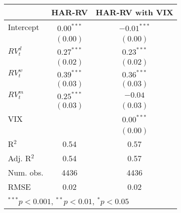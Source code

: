 
\begin{tabular}{l c c }
\hline
 & HAR-RV & HAR-RV with VIX \\
\hline
Intercept    & $0.00^{***}$ & $-0.01^{***}$ \\
             & $(0.00)$     & $(0.00)$      \\
$RV_{t}^{d}$ & $0.27^{***}$ & $0.23^{***}$  \\
             & $(0.02)$     & $(0.02)$      \\
$RV_{t}^{w}$ & $0.39^{***}$ & $0.36^{***}$  \\
             & $(0.03)$     & $(0.03)$      \\
$RV_{t}^{m}$ & $0.25^{***}$ & $-0.04$       \\
             & $(0.03)$     & $(0.03)$      \\
VIX          &              & $0.00^{***}$  \\
             &              & $(0.00)$      \\
\hline
R$^2$        & 0.54         & 0.57          \\
Adj. R$^2$   & 0.54         & 0.57          \\
Num. obs.    & 4436         & 4436          \\
RMSE         & 0.02         & 0.02          \\
\hline
\multicolumn{3}{l}{\scriptsize{$^{***}p<0.001$, $^{**}p<0.01$, $^*p<0.05$}}
\end{tabular}
